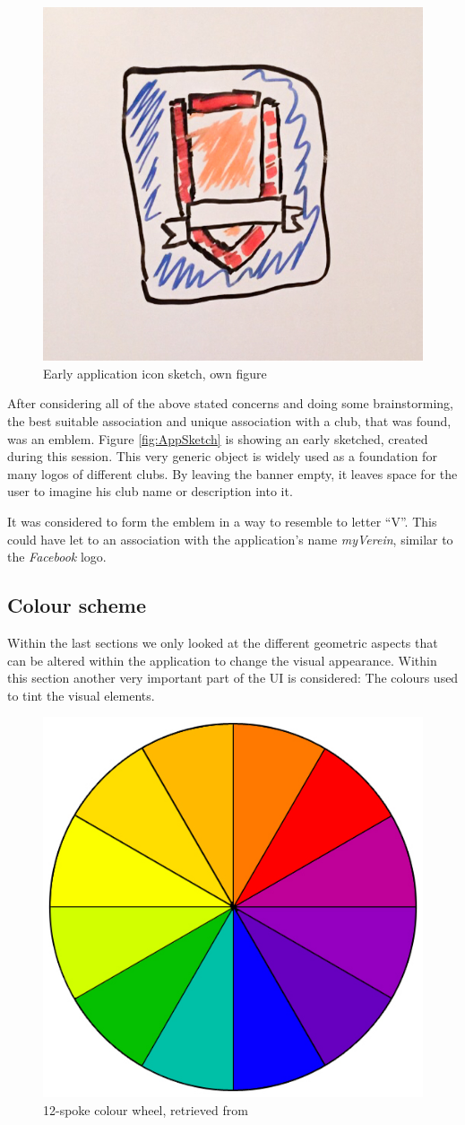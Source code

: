 \begin{figure}[h]
  	\centering
  	\includegraphics[width=0.5\linewidth]{./images/app-sketch.jpg}
  	\caption{Early application icon sketch, own figure}
	\label{fig:AppSketch}
\end{figure}

After considering all of the above stated concerns and doing some brainstorming, the best suitable association and unique association with a club, that was found, was an emblem. Figure \vref{fig:AppSketch} is showing an early sketched, created during this session. This very generic object is widely used as a foundation for many logos of different clubs. By leaving the banner empty, it leaves space for the user to imagine his club name or description into it. 

It was considered to form the emblem in a way to resemble to letter \enquote{V}. This could have let to an association with the application's name \emph{myVerein}, similar to the \emph{Facebook} logo. 

\subsection{Colour scheme}

Within the last sections we only looked at the different geometric aspects that can be altered within the application to change the visual appearance. Within this section another very important part of the \gls{UI} is considered: The colours used to tint the visual elements. 

\begin{figure}[h]
  	\centering
  	\includegraphics[width=0.5\linewidth]{./images/colorwheel.jpg}
  	\caption{12-spoke colour wheel, retrieved from \cite{Chapman:2010ab}}
	\label{fig:ColourWheel}
\end{figure}

